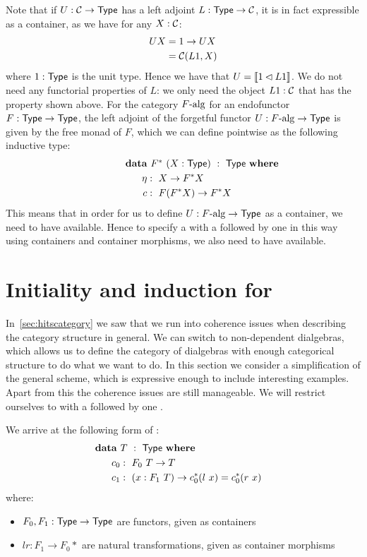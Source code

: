 \documentclass[a4paper,10pt]{article}
\begin{document}
Note that if $U : \mathcal{C} \to \mathsf{Type}$ has a left adjoint $L : \mathsf{Type} \to \mathcal{C}$,
it is in fact expressible as a container, as we have for any $X : \mathcal{C}$:
%
\begin{align*}
  U X &= 1 \to U X \\
      &= \mathcal{C}(L1, X)
\end{align*}
%
where $1 : \mathsf{Type}$ is the unit type. Hence we have that
$U = \llbracket 1 \lhd L 1 \rrbracket$. We do not need any functorial properties of $L$:
we only need the object $L1 : \mathcal{C}$ that has the property shown
above. For the category $F\mbox{-alg}$ for an endofunctor
$F : \mathsf{Type} \to \mathsf{Type}$, the left adjoint of the forgetful functor
$U : F\mbox{-alg} \to \mathsf{Type}$ is given by the free monad of $F$, which we
can define pointwise as the following inductive type:
%
\begin{alignat*}{2}
  &\rlap{$\data\ F^*\ (X : \Type)\ :\ \Type\ \where$} \\
  &&\ \ \eta &:\ X \to F^* X \\
  &&\ \ c    &:\ F(F^*X) \to F^* X
\end{alignat*}
%
This means that in order for us to define $U : F\mbox{-alg} \to \mathsf{Type}$
as a container, we need to have \oits available. Hence to specify \eg
a \hit with a \zeroconstructor followed by one \oneconstructor in this
way using containers and container morphisms, we also need to have
\oits available.

\section{Initiality and induction for \onehits}
\label{sec:onehits}

In~\cref{sec:hitscategory} we saw that we run into coherence issues
when describing the category structure in general. We can switch to
non-dependent dialgebras, which allows us to define the category of
dialgebras with enough categorical structure to do what we want to
do. In this section we consider a simplification of the general
scheme, which is expressive enough to include interesting
examples. Apart from this the coherence issues are still
manageable. We will restrict ourselves to \hits with a
\zeroconstructors followed by one \oneconstructor. 



We arrive at the following form of \hits:
%
\begin{alignat*}{2}
  &\rlap{$\data\ T\ :\ \Type\ \where$} \\
  &&\ \ c_0  &:\ F_0\ T \to T \\
  &&\ \ c_1  &:\ (x : F_1\ T) \to c_0^* (l\ x) = c_0^* (r\ x)
\end{alignat*}
%
where:
\begin{itemize}
\item $F_0, F_1 : \mathsf{Type} \to \mathsf{Type}$ are functors, given as containers
\item $l r : F_1 \to F_0 *$ are natural transformations, given as container morphisms
\end{itemize}
\end{document}
